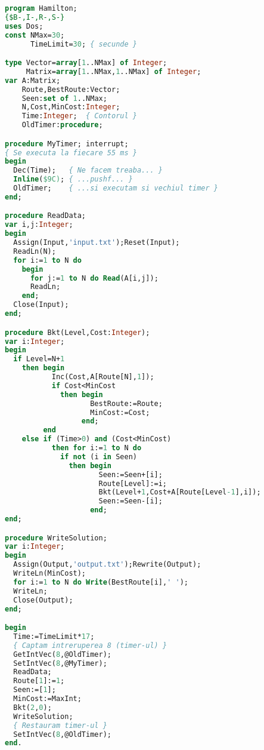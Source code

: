 \begin{lstlisting}[language=Pascal]
program Hamilton;
{$B-,I-,R-,S-}
uses Dos;
const NMax=30;
      TimeLimit=30; { secunde }

type Vector=array[1..NMax] of Integer;
     Matrix=array[1..NMax,1..NMax] of Integer;
var A:Matrix;
    Route,BestRoute:Vector;
    Seen:set of 1..NMax;
    N,Cost,MinCost:Integer;
    Time:Integer;  { Contorul }
    OldTimer:procedure;

procedure MyTimer; interrupt;
{ Se executa la fiecare 55 ms }
begin
  Dec(Time);   { Ne facem treaba... }
  Inline($9C); { ...pushf... }
  OldTimer;    { ...si executam si vechiul timer }
end;

procedure ReadData;
var i,j:Integer;
begin
  Assign(Input,'input.txt');Reset(Input);
  ReadLn(N);
  for i:=1 to N do
    begin
      for j:=1 to N do Read(A[i,j]);
      ReadLn;
    end;
  Close(Input);
end;

procedure Bkt(Level,Cost:Integer);
var i:Integer;
begin
  if Level=N+1
    then begin
           Inc(Cost,A[Route[N],1]);
           if Cost<MinCost
             then begin
                    BestRoute:=Route;
                    MinCost:=Cost;
                  end;
         end
    else if (Time>0) and (Cost<MinCost)
           then for i:=1 to N do
             if not (i in Seen)
               then begin
                      Seen:=Seen+[i];
                      Route[Level]:=i;
                      Bkt(Level+1,Cost+A[Route[Level-1],i]);
                      Seen:=Seen-[i];
                    end;
end;

procedure WriteSolution;
var i:Integer;
begin
  Assign(Output,'output.txt');Rewrite(Output);
  WriteLn(MinCost);
  for i:=1 to N do Write(BestRoute[i],' ');
  WriteLn;
  Close(Output);
end;

begin
  Time:=TimeLimit*17;
  { Captam intreruperea 8 (timer-ul) }
  GetIntVec(8,@OldTimer);
  SetIntVec(8,@MyTimer);
  ReadData;
  Route[1]:=1;
  Seen:=[1];
  MinCost:=MaxInt;
  Bkt(2,0);
  WriteSolution;
  { Restauram timer-ul }
  SetIntVec(8,@OldTimer);
end.
\end{lstlisting}

